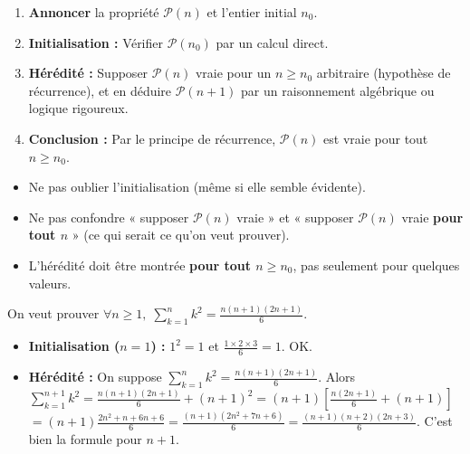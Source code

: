 \documentclass[11pt]{article}
\begin{document}
\begin{methode}
\begin{enumerate}
\item \textbf{Annoncer} la propriété $\mathcal{P}(n)$ et l'entier initial $n_0$.
\item \textbf{Initialisation :} Vérifier $\mathcal{P}(n_0)$ par un calcul direct.
\item \textbf{Hérédité :} Supposer $\mathcal{P}(n)$ vraie pour un $n \geq n_0$ arbitraire (hypothèse de récurrence), et en déduire $\mathcal{P}(n+1)$ par un raisonnement algébrique ou logique rigoureux.
\item \textbf{Conclusion :} Par le principe de récurrence, $\mathcal{P}(n)$ est vraie pour tout $n \geq n_0$.
\end{enumerate}
\end{methode}

\begin{attention}
\begin{itemize}
\item Ne pas oublier l'initialisation (même si elle semble évidente).
\item Ne pas confondre « supposer $\mathcal{P}(n)$ vraie » et « supposer $\mathcal{P}(n)$ vraie \textbf{pour tout $n$} » (ce qui serait ce qu'on veut prouver).
\item L'hérédité doit être montrée \textbf{pour tout $n \geq n_0$}, pas seulement pour quelques valeurs.
\end{itemize}
\end{attention}

\begin{exemplebox}
On veut prouver $\forall n \geq 1,\; \sum_{k=1}^n k^2 = \frac{n(n+1)(2n+1)}{6}$.
\begin{itemize}
\item \textbf{Initialisation ($n=1$) :} $1^2 = 1$ et $\frac{1\times2\times3}{6}=1$. OK.
\item \textbf{Hérédité :} On suppose $\sum_{k=1}^n k^2 = \frac{n(n+1)(2n+1)}{6}$.
Alors $\sum_{k=1}^{n+1} k^2 = \frac{n(n+1)(2n+1)}{6} + (n+1)^2 = (n+1)\left[\frac{n(2n+1)}{6} + (n+1)\right]$
$= (n+1)\frac{2n^2+n+6n+6}{6} = \frac{(n+1)(2n^2+7n+6)}{6} = \frac{(n+1)(n+2)(2n+3)}{6}$.
C'est bien la formule pour $n+1$.
\end{itemize}
\end{exemplebox}
\end{document}
